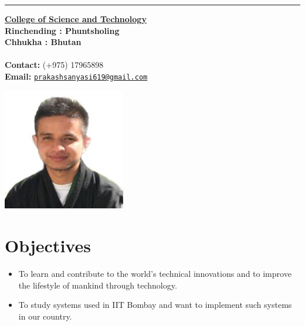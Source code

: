 \documentclass[10pt]{article}
\renewcommand{\maketitle}{
	\begin{center}
	{\bfseries \Huge
	\theauthor}
	\rule{17.5cm}{1pt}
	\end{center}	
}
\begin{document}
	\author{Prakash Sanyasi}
	\maketitle
	
	\begin{minipage}{0.5\linewidth}
		\href{http://cst.edu.bt/}{\bf College of Science and Technology} \\
		{\bf Rinchending : Phuntsholing} \\
		{\bf Chhukha : Bhutan}\\ \\
		{\bf Contact: } (+975) 17965898 \\
		{\bf Email: } \href{mailto:prakashsanyasi619@gmail.com}{\tt prakashsanyasi619@gmail.com} \\
	\end{minipage}
	\begin{minipage}{0.45\linewidth}
		\raggedleft
		\includegraphics[width=0.4\textwidth]{cover_photo}
	\end{minipage}

	\vspace{0.5cm}
	\section{Objectives}
	\begin{itemize}
		\item  To learn and contribute to the world’s technical innovations and to improve the lifestyle of mankind through technology.
		\item  To study systems used in IIT Bombay and want to implement such systems in our country.
	\end{itemize}
	
\end{document}
